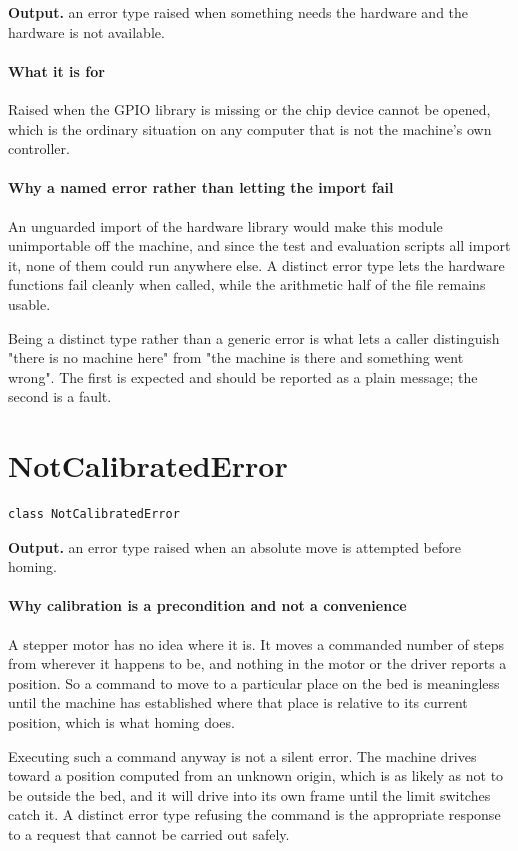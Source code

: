 \noindent\textbf{Output.} an error type raised when something needs the hardware and the hardware is not available.


\paragraph{What it is for}
Raised when the GPIO library is missing or the chip device cannot be opened, which is the ordinary situation on any computer that is not the machine's own controller.


\paragraph{Why a named error rather than letting the import fail}
An unguarded import of the hardware library would make this module unimportable off the machine, and since the test and evaluation scripts all import it, none of them could run anywhere else. A distinct error type lets the hardware functions fail cleanly when called, while the arithmetic half of the file remains usable.

Being a distinct type rather than a generic error is what lets a caller distinguish "there is no machine here" from "the machine is there and something went wrong". The first is expected and should be reported as a plain message; the second is a fault.


\section{NotCalibratedError}
\begin{lstlisting}[style=sig]
class NotCalibratedError
\end{lstlisting}

\noindent\textbf{Output.} an error type raised when an absolute move is attempted before homing.


\paragraph{Why calibration is a precondition and not a convenience}
A stepper motor has no idea where it is. It moves a commanded number of steps from wherever it happens to be, and nothing in the motor or the driver reports a position. So a command to move to a particular place on the bed is meaningless until the machine has established where that place is relative to its current position, which is what homing does.

Executing such a command anyway is not a silent error. The machine drives toward a position computed from an unknown origin, which is as likely as not to be outside the bed, and it will drive into its own frame until the limit switches catch it. A distinct error type refusing the command is the appropriate response to a request that cannot be carried out safely.


